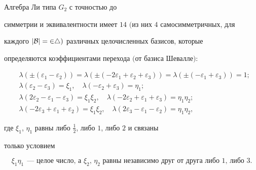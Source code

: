 \begin{athm}


Алгебра Ли типа $G_2$ с точностью до


симметрии и эквивалентности имеет $14$ $($из них $4$ самосимметричных, для


каждого $|\cal B|=24)$ различных целочисленных базисов, которые


определяются коэффициентами перехода $($от базиса Шевалле$){:}$


\begin{equation}


\begin{split}


&\lambda(\pm(\varepsilon_1-\varepsilon_2))=


\lambda(\pm(-2\varepsilon_1+\varepsilon_2+\varepsilon_3))=


\lambda(\pm(-\varepsilon_1+\varepsilon_3))=1; \\


&\lambda(\varepsilon_2-\varepsilon_3)=\xi_1,\quad


\lambda(-\varepsilon_2+\varepsilon_3)=\eta_1;  \\


&\lambda(2\varepsilon_2-\varepsilon_1-\varepsilon_3)=\xi_1\xi_2,\quad


\lambda(-2\varepsilon_2+\varepsilon_1+\varepsilon_3)=\eta_1\eta_2;  \\


&\lambda(-2\varepsilon_3+\varepsilon_1+\varepsilon_2)=\xi_1\xi_2,\quad


\lambda(2\varepsilon_3-\varepsilon_1-\varepsilon_2)=\eta_1\eta_2,


\end{split}


\tag{$\mathrm g$}


\end{equation}


где $\xi_1$, $\eta_1$ равны либо $\frac12$, либо $1$, либо $2$ и связаны


только условием


\begin{equation}


\xi_1\eta_1\ \ \text{--- целое число, а $\xi_2$, $\eta_2$ равны


независимо друг от друга либо $1$, либо $3$}.


\end{equation}


\end{athm}





